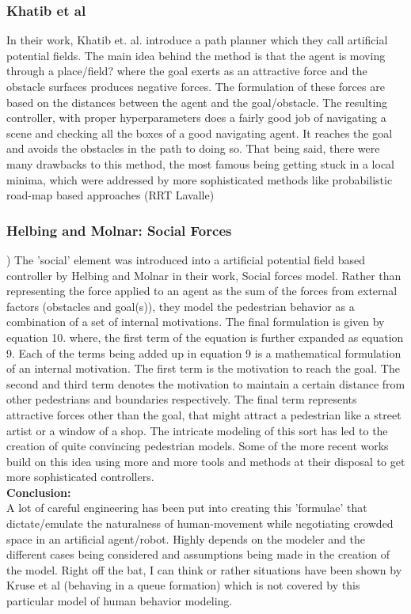 \subsubsection*{Khatib et al}
In their work, Khatib et. al. introduce a path planner which they call artificial potential fields. The main idea behind the method is that the agent is moving through a place/field? where the goal exerts as an attractive force and the obstacle surfaces produces negative forces. The formulation of these forces are based on the distances between the agent and the goal/obstacle. The resulting controller, with proper hyperparameters does a fairly good job of navigating a scene and checking all the boxes of a good navigating agent. It reaches the goal and avoids the obstacles in the path to doing so. That being said, there were many drawbacks to this method, the most famous being getting stuck in a local minima, which were addressed by more sophisticated methods like probabilistic road-map based approaches (RRT Lavalle)
\subsubsection*{Helbing and Molnar: Social Forces})
The 'social' element was introduced into a artificial potential field based controller by Helbing and Molnar in their work, Social forces model.
Rather than representing the force applied to an agent as the sum of the forces from external factors (obstacles and goal(s)), they model the pedestrian behavior as a combination of a set of internal motivations. 
The final formulation is given by equation 10.
where, the first term of the equation is further expanded as equation 9.
Each of the terms being added up in equation 9 is a mathematical formulation of an internal motivation.
The first term is the motivation to reach the goal.
The second and third term denotes the motivation to maintain a certain distance from other pedestrians and boundaries respectively.
The final term represents attractive forces other than the goal, that might attract a pedestrian like a street artist or a window of a shop.
The intricate modeling of this sort has led to the creation of quite convincing pedestrian models. 
Some of the more recent works build on this idea using more and more tools and methods at their disposal to get more sophisticated controllers.\\
\textbf{Conclusion:}\\
A lot of careful engineering has been put into creating this 'formulae' that dictate/emulate the naturalness of human-movement while negotiating crowded space in an artificial agent/robot. 
Highly depends on the modeler and the different cases being considered and assumptions being made in the creation of the model. 
Right off the bat, I can think or rather situations have been shown by Kruse et al (behaving in a queue formation) which is not covered by this particular model of human behavior modeling.
